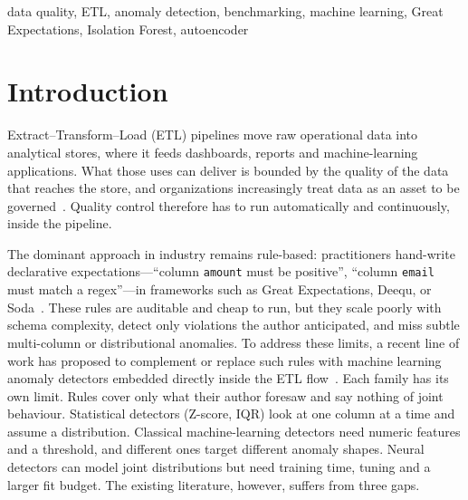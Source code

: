 \documentclass[conference]{IEEEtran}
\begin{document}
\begin{abstract}
at most $20{,}000$ rows, do not beat the best classical one; overlapping intervals leave these differences unresolved and are not
evidence that the detectors are equivalent. The per-type view, which depends on numeric-only features for the learned models
and on generic Great Expectations rules, shows a narrow, largely non-overlapping competence for each family, which holds in
structure on real tables but not in its values. The operating point moves precision and recall by an order of magnitude with
the same scores, and a threshold fixed on the past fails when the prevalence moves. Cost depends on the architecture: at
$3\cdot10^5$ rows, measured on one machine that was not isolated, ECOD, COPOD, HBOS and PCA take seconds, the VAE and Deep SVDD
three to four minutes, and DIF, AE1SVM and LUNAR exceed a $300$-second budget at $3\cdot10^5$, $3\cdot10^5$ and $10^5$ rows. Within
these limits, broad coverage needs several families, chosen from the type of fault, with the operating point and the
prevalence monitored.
\end{abstract}

\begin{IEEEkeywords}
data quality, ETL, anomaly detection, benchmarking, machine learning,
Great Expectations, Isolation Forest, autoencoder
\end{IEEEkeywords}

\section{Introduction}

Extract--Transform--Load (ETL) pipelines move raw operational data into analytical
stores, where it feeds dashboards, reports and machine-learning applications. What those uses
can deliver is bounded by the quality of the data that reaches the store, and organizations
increasingly treat data as an asset to be governed~\cite{khatri2010data}. Quality control
therefore has to run automatically and continuously, inside the pipeline.

The dominant approach in industry remains rule-based: practitioners
hand-write declarative expectations---``column \texttt{amount} must be
positive'', ``column \texttt{email} must match a regex''---in
frameworks such as Great Expectations, Deequ, or
Soda~\cite{dataqualitysurvey2024}. These rules are auditable and
cheap to run, but they scale poorly with schema complexity, detect only
violations the author anticipated, and miss subtle multi-column or
distributional anomalies. To address these limits, a recent line of
work has proposed to complement or replace such rules with machine
learning anomaly detectors embedded directly inside the ETL
flow~\cite{gopa2025aiaugmented,marupaka2024mlpredictive,sokkula2024implementing}.
Each family has its own limit. Rules cover only what their author foresaw and say nothing
of joint behaviour. Statistical detectors (Z-score, IQR) look at one column at a time and
assume a distribution. Classical machine-learning detectors need numeric features and a
threshold, and different ones target different anomaly shapes. Neural detectors can model joint
distributions but need training time, tuning and a larger fit budget. The existing literature,
however, suffers from three gaps.
\end{document}
